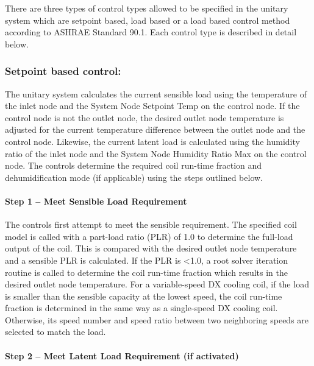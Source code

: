 There are three types of control types allowed to be specified in the unitary system which are setpoint based, load based or a load based control method according to ASHRAE Standard 90.1. Each control type is described in detail below.

\subsubsection{Setpoint based control:}\label{setpoint-based-control}

The unitary system calculates the current sensible load using the temperature of the inlet node and the System Node Setpoint Temp on the control node. If the control node is not the outlet node, the desired outlet node temperature is adjusted for the current temperature difference between the outlet node and the control node. Likewise, the current latent load is calculated using the humidity ratio of the inlet node and the System Node Humidity Ratio Max on the control node. The controls determine the required coil run-time fraction and dehumidification mode (if applicable) using the steps outlined below.

\paragraph{Step 1 -- Meet Sensible Load Requirement}\label{step-1-meet-sensible-load-requirement}

The controls first attempt to meet the sensible requirement. The specified coil model is called with a part-load ratio (PLR) of 1.0 to determine the full-load output of the coil. This is compared with the desired outlet node temperature and a sensible PLR is calculated. If the PLR is \textless{}1.0, a root solver iteration routine is called to determine the coil run-time fraction which results in the desired outlet node temperature. For a variable-speed DX cooling coil, if the load is smaller than the sensible capacity at the lowest speed, the coil run-time fraction is determined in the same way as a single-speed DX cooling coil. Otherwise, its speed number and speed ratio between two neighboring speeds are selected to match the load.

\paragraph{Step 2 -- Meet Latent Load Requirement (if activated)}\label{step-2-meet-latent-load-requirement-if-activated}


